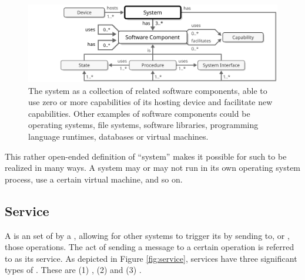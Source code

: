 \begin{figure}[ht!]
  \centering
  \includegraphics[scale=0.9]{figures/system}
  \caption{
    The system as a collection of related software components, able to use zero or more capabilities of its hosting device and facilitate new capabilities.
    Other examples of software components could be operating systems, file systems, software libraries, programming language runtimes, databases or virtual machines.
  }
  \label{fig:system}
\end{figure}

This rather open-ended definition of ``system'' makes it possible for such to be realized in many ways.
A system may or may not run in its own operating system process, use a certain virtual machine, and so on.

\subsection{Service}
\label{sec:concepts:service}

A  is an  set of   by a , allowing for other systems to trigger its  by sending  to, or , those operations.
The act of sending a message to a certain operation is referred to as  its service.
As depicted in Figure \ref{fig:service}, services have three significant types of .
These are (1) , (2)  and (3) .

